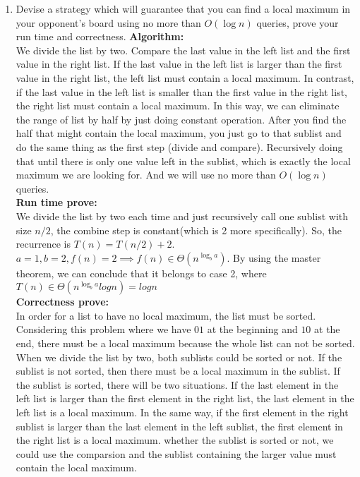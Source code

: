 \documentclass[10pt]{article}
\begin{document}
\begin{enumerate}
    \item Devise a strategy which will guarantee that you can find a local maximum in your opponent's board using no more than $O(\log n)$ queries, prove your run time and correctness.
    \textbf{Algorithm:} \\
    We divide the list by two. Compare the last value in the left list and the first value in the right list. If the last value in the left list is larger than the first value in the right list, the left list must contain a local maximum. In contrast, if the last value in the left list is smaller than the first value in the right list, the right list must contain a local maximum. In this way, we can eliminate the range of list by half by just doing constant operation. After you find the half that might contain the local maximum, you just go to that sublist and do the same thing as the first step (divide and compare). Recursively doing that until there is only one value left in the sublist, which is exactly the local maximum we are looking for. And we will use no more than $O(\log n)$ queries. \\
    \textbf{Run time prove:}\\
    We divide the list by two each time and just recursively call one sublist with size $n/2$, the combine step is constant(which is 2 more specifically). So, the recurrence is $T(n) = T(n/2) + 2$. $a = 1, b = 2, f(n) = 2 \implies f(n) \in \Theta(n^{\log_b a}).$ By using the master theorem, we can conclude that it belongs to case 2, where $T(n) \in \Theta(n^{\log_b a}logn) = logn$\\
    \textbf{Correctness prove:}\\
    In order for a list to have no local maximum, the list must be sorted. Considering this problem where we have $01$ at the beginning and $10$ at the end, there must be a local maximum because the whole list can not be sorted. When we divide the list by two, both sublists could be sorted or not. If the sublist is not sorted, then there must be a local maximum in the sublist. If the sublist is sorted, there will be two situations. If the last element in the left list is larger than the first element in the right list, the last element in the left list is a local maximum. In the same way, if the first element in the right sublist is larger than the last element in the left sublist, the first element in the right list is a local maximum. whether the sublist is sorted or not, we could use the comparsion and the sublist containing the larger value must contain the local maximum. 
    

\end{enumerate}
\end{document}
